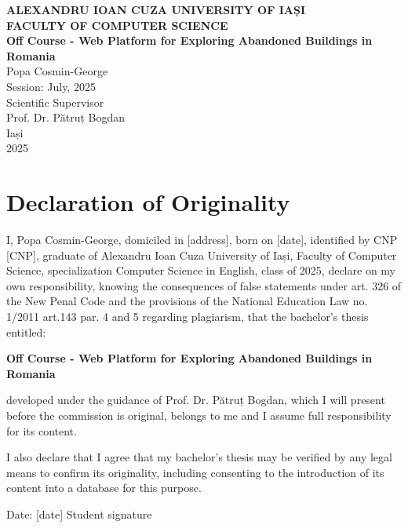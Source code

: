 \documentclass[12pt,a4paper]{report}
\begin{document}
\begin{titlepage}
    \centering
    {\Large \textbf{ALEXANDRU IOAN CUZA UNIVERSITY OF IAȘI}}\\[0.5cm]
    {\Large \textbf{FACULTY OF COMPUTER SCIENCE}}\\[2cm]
    
    {\Huge \textbf{Off Course - Web Platform for Exploring Abandoned Buildings in Romania}}\\[3cm]
    
    {\Large Popa Cosmin-George}\\[2cm]
    
    {\large Session: July, 2025}\\[2cm]
    
    {\large Scientific Supervisor}\\
    {\large Prof. Dr. Pătruț Bogdan}\\[2cm]
    
    \vfill
    {\large Iași}\\
    {\large 2025}
\end{titlepage}

\chapter*{Declaration of Originality}

I, Popa Cosmin-George, domiciled in [address], born on [date], identified by CNP [CNP], graduate of Alexandru Ioan Cuza University of Iași, Faculty of Computer Science, specialization Computer Science in English, class of 2025, declare on my own responsibility, knowing the consequences of false statements under art. 326 of the New Penal Code and the provisions of the National Education Law no. 1/2011 art.143 par. 4 and 5 regarding plagiarism, that the bachelor's thesis entitled:

\textbf{Off Course - Web Platform for Exploring Abandoned Buildings in Romania}

developed under the guidance of Prof. Dr. Pătruț Bogdan, which I will present before the commission is original, belongs to me and I assume full responsibility for its content.

I also declare that I agree that my bachelor's thesis may be verified by any legal means to confirm its originality, including consenting to the introduction of its content into a database for this purpose.

\vspace{2cm}
Date: [date] \hfill Student signature
\end{document}
